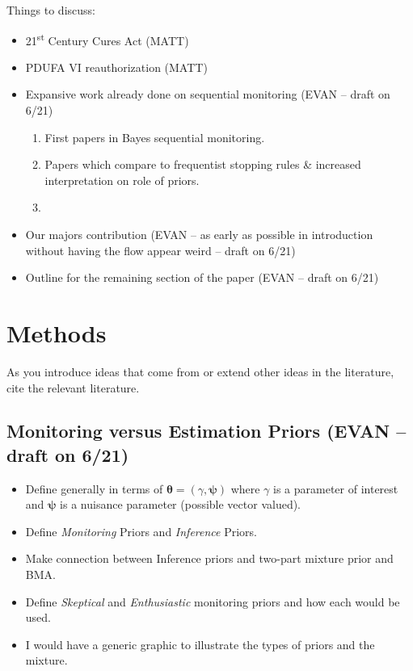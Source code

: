 \documentclass[12pt]{article}
\begin{document}
Things to discuss:
\begin{itemize}
 \item 21\textsuperscript{st} Century Cures Act (MATT)
 \item PDUFA VI reauthorization (MATT)
 \item Expansive work already done on sequential monitoring  (EVAN -- draft on 6/21)
\begin{enumerate}
\item First papers in Bayes sequential monitoring.
\item Papers which compare to frequentist stopping rules \& increased interpretation on role of priors.
\item 
\end{enumerate}
 \item Our majors contribution (EVAN -- as early as possible in introduction without having the flow appear weird -- draft on 6/21)
 \item Outline for the remaining section of the paper (EVAN -- draft on 6/21)
\end{itemize}
\section{Methods}

As you introduce ideas that come from or extend other ideas in the literature, cite the relevant literature.

\subsection{Monitoring versus Estimation Priors (EVAN -- draft on 6/21)}

\begin{itemize}
 \item Define generally in terms of $\boldsymbol\theta = \left( \gamma, \boldsymbol\psi  \right)$ where $\gamma$ is a parameter of interest
       and $\boldsymbol\psi$ is a nuisance parameter (possible vector valued).
 \item Define \textit{Monitoring} Priors and \textit{Inference} Priors.
 \item Make connection between Inference priors and two-part mixture prior and BMA.
 \item Define \textit{Skeptical} and \textit{Enthusiastic} monitoring priors and how each would be used.
 \item I would have a generic graphic to illustrate the types of priors and the mixture.
\end{itemize}
\end{document}
